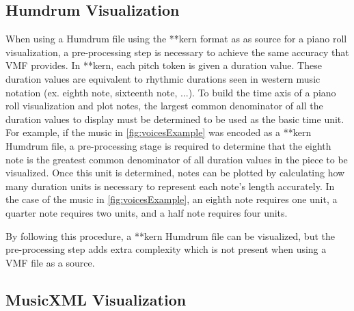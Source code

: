 \subsection{Humdrum Visualization}

When using a Humdrum file using the **kern format as as source for a piano roll visualization, a pre-processing step is necessary to achieve the same accuracy that VMF provides. In **kern, each pitch token is given a duration value. These duration values are equivalent to rhythmic durations seen in western music notation (ex. eighth note, sixteenth note, ...). To build the time axis of a piano roll visualization and plot notes, the largest common denominator of all the duration values to display must be determined to be used as the basic time unit. For example, if the music in \ref{fig:voicesExample} was encoded as a **kern Humdrum file, a pre-processing stage is required to determine that the eighth note is the greatest common denominator of all duration values in the piece to be visualized. Once this unit is determined, notes can be plotted by calculating how many duration units is necessary to represent each note's length accurately. In the case of the music in \ref{fig:voicesExample}, an eighth note requires one unit, a quarter note requires two units, and a half note requires four units.

By following this procedure, a **kern Humdrum file can be visualized, but the pre-processing step adds extra complexity which is not present when using a VMF file as a source.

\subsection{MusicXML Visualization}